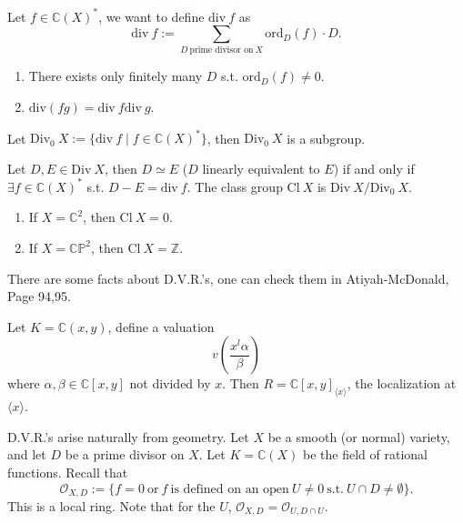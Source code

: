 \documentclass[a4paper,12pt]{amsart}
\newcommand{\ZZ}{\mathbb{Z}}
\newcommand{\CC}{\mathbb{C}}
\begin{document}
\begin{definition}
	Let $f\in\CC(X)^*$, we want to define $\mathrm{div}~f$ as
	\begin{displaymath}
	\mathrm{div}~f:=\sum_{D~\text{prime divisor on}~X}\mathrm{ord}_D(f)\cdot D.
	\end{displaymath}
\end{definition}

\begin{Fact}
	\begin{enumerate}
		\item There exists only finitely many $D$ s.t. $\mathrm{ord}_D(f)\neq0$.
		\item $\mathrm{div}(fg)=\mathrm{div}~f\mathrm{div}~g$.
	\end{enumerate}
\end{Fact}

Let $\mathrm{Div}_0~X:=\{\mathrm{div}~f\mid f\in\CC(X)^*\}$, then $\mathrm{Div}_0~X$ is a subgroup.

\begin{definition}
	Let $D,E\in\mathrm{Div}~X$, then $D\simeq E$ ($D$ linearly equivalent to $E$) if and only if $\exists f\in\CC(X)^*$ s.t. $D-E=\mathrm{div}~f$. The class group $\mathrm{Cl}~X$ is $\mathrm{Div}~X/\mathrm{Div}_0~X$.
\end{definition}

\begin{example}
	\begin{enumerate}
		\item If $X=\CC^2$, then $\mathrm{Cl}~X=0$.
		\item If $X=\mathbb{CP}^2$, then $\mathrm{Cl}~X=\ZZ$.
	\end{enumerate}
\end{example}

There are some facts about D.V.R.'s, one can check them in Atiyah-McDonald, Page 94,95.

\begin{example}
	Let $K=\CC(x,y)$, define a valuation
	\begin{displaymath}
	v\left(\frac{x^l\alpha}{\beta}\right)
	\end{displaymath}
	where $\alpha,\beta\in\CC[x,y]$ not divided by $x$. Then $R=\CC[x,y]_{\langle x\rangle}$, the localization at $\langle x\rangle$.
\end{example}

D.V.R.'s arise naturally from geometry. Let $X$ be a smooth (or normal) variety, and let $D$ be a prime divisor on $X$. Let $K=\CC(X)$ be the field of rational functions. Recall that
\begin{displaymath}
\mathscr{O}_{X,D}:=\{f=0~\text{or}~f~\text{is defined on an open}~U\neq0~\text{s.t.}~U\cap D\neq\emptyset\}.
\end{displaymath}
This is a local ring. Note that for the $U$, $\mathscr{O}_{X,D}=\mathscr{O}_{U,D\cap U}$.
\end{document}
